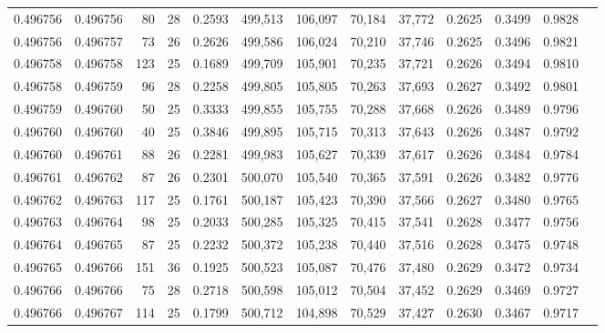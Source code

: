 \begin{tabular}{rrrrrrrrrrrrr}
0.496756 & 0.496756 &  80 &  28 &                                     0.2593 & 499,513 & 106,097 &  70,184 &  37,772 & 0.2625 & 0.3499 & 0.9828 \\
0.496756 & 0.496757 &  73 &  26 &                                     0.2626 & 499,586 & 106,024 &  70,210 &  37,746 & 0.2625 & 0.3496 & 0.9821 \\
0.496758 & 0.496758 & 123 &  25 &                                     0.1689 & 499,709 & 105,901 &  70,235 &  37,721 & 0.2626 & 0.3494 & 0.9810 \\
0.496758 & 0.496759 &  96 &  28 &                                     0.2258 & 499,805 & 105,805 &  70,263 &  37,693 & 0.2627 & 0.3492 & 0.9801 \\
0.496759 & 0.496760 &  50 &  25 &                                     0.3333 & 499,855 & 105,755 &  70,288 &  37,668 & 0.2626 & 0.3489 & 0.9796 \\
0.496760 & 0.496760 &  40 &  25 &                                     0.3846 & 499,895 & 105,715 &  70,313 &  37,643 & 0.2626 & 0.3487 & 0.9792 \\
0.496760 & 0.496761 &  88 &  26 &                                     0.2281 & 499,983 & 105,627 &  70,339 &  37,617 & 0.2626 & 0.3484 & 0.9784 \\
0.496761 & 0.496762 &  87 &  26 &                                     0.2301 & 500,070 & 105,540 &  70,365 &  37,591 & 0.2626 & 0.3482 & 0.9776 \\
0.496762 & 0.496763 & 117 &  25 &                                     0.1761 & 500,187 & 105,423 &  70,390 &  37,566 & 0.2627 & 0.3480 & 0.9765 \\
0.496763 & 0.496764 &  98 &  25 &                                     0.2033 & 500,285 & 105,325 &  70,415 &  37,541 & 0.2628 & 0.3477 & 0.9756 \\
0.496764 & 0.496765 &  87 &  25 &                                     0.2232 & 500,372 & 105,238 &  70,440 &  37,516 & 0.2628 & 0.3475 & 0.9748 \\
0.496765 & 0.496766 & 151 &  36 &                                     0.1925 & 500,523 & 105,087 &  70,476 &  37,480 & 0.2629 & 0.3472 & 0.9734 \\
0.496766 & 0.496766 &  75 &  28 &                                     0.2718 & 500,598 & 105,012 &  70,504 &  37,452 & 0.2629 & 0.3469 & 0.9727 \\
0.496766 & 0.496767 & 114 &  25 &                                     0.1799 & 500,712 & 104,898 &  70,529 &  37,427 & 0.2630 & 0.3467 & 0.9717 \\

\end{tabular}
